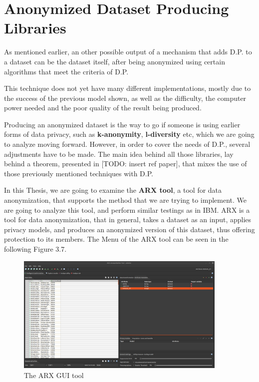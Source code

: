 \section{Anonymized Dataset Producing Libraries}

As mentioned earlier, an other possible output of a mechanism that adds D.P. to a dataset can be the dataset itself, after being anonymized using certain algorithms that meet the criteria of D.P.

This technique does not yet have many different implementations, mostly due to the success of the previous model shown, as well as the difficulty, the computer power needed and the poor quality of the result being produced.

Producing an anonymized dataset is the way to go if someone is using earlier forms of data privacy, such as \textbf{k-anonymity}, \textbf{l-diversity} etc, which we are going to analyze moving forward. However, in order to cover the needs of D.P., several adjustments have to be made. The main idea behind all those libraries, lay behind a theorem, presented in [TODO: insert ref paper], that mixes the use of those previously mentioned techniques with D.P.

In this Thesis, we are going to examine the \textbf{ARX tool}, a tool for data anonymization, that supports the method that we are trying to implement. We are going to analyze this tool, and perform similar testings as in IBM. ARX is a tool for data anonymization, that in general, takes a dataset as an input, applies  privacy models, and produces an anonymized version of this dataset, thus offering protection to its members. The Menu of the ARX tool can be seen in the following Figure 3.7.

\begin{figure}[!htb]\centering
    \includegraphics[width=0.9\textwidth]{images/arx_tool.png}
    \caption{The ARX GUI tool}
\end{figure}


